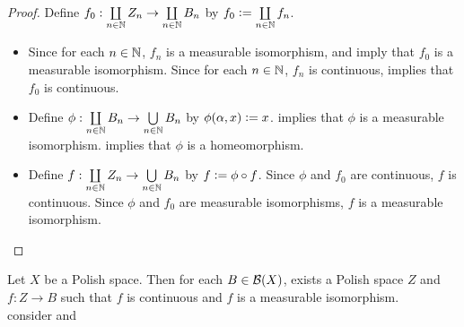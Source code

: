 \documentclass{book}
\begin{document}
	\begin{proof} Define $f_0: \coprod\limits_{n \in \mathbb{N}} Z_n \rightarrow \coprod\limits_{n \in \mathbb{N}}B_n$ by $f_0 \vcentcolon= \coprod\limits_{n \in \mathbb{N}} f_n$. 
		\begin{itemize}
			\item Since for each $n \in \mathbb{N}$, $f_n$ is a measurable isomorphism,  and   imply that $f_0$ is a measurable isomorphism. Since for each $n \in \mathbb{N}$, $f_n$ is continuous,  implies that $f_0$ is continuous.
			\item Define $\phi: \coprod\limits_{n \in \mathbb{N}} B_n \rightarrow \bigcup\limits_{n \in \mathbb{N}} B_n$ by $\phi(\alpha, x) \vcentcolon= x$.  implies that $\phi$ is a measurable isomorphism.  implies that $\phi$ is a homeomorphism. 
			\item Define $f: \coprod\limits_{n \in \mathbb{N}} Z_n \rightarrow \bigcup\limits_{n \in \mathbb{N}}B_n$ by $f \vcentcolon= \phi \circ f$. Since $\phi$ and $f_0$ are continuous, $f$ is continuous. Since $\phi$ and $f_0$ are measurable isomorphisms, $f$ is a measurable isomorphism.
		\end{itemize}
	\end{proof}

	\begin{ex} 
		Let $X$ be a Polish space. Then for each $B \in \mathcal{B}(X)$, exists a Polish space $Z$ and $f:Z \rightarrow B$ such that $f$ is continuous and $f$ is a measurable isomorphism. \\
		 consider  and    
	\end{ex}
\end{document}
